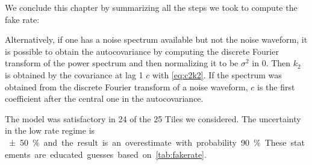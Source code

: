 We conclude this chapter by summarizing all the steps we took to compute the
fake rate:
%
%
Alternatively, if one has a noise spectrum available but not the noise
waveform, it is possible to obtain the autocovariance by computing the discrete
Fourier transform of the power spectrum \cite[84]{ferrante2015} and then
normalizing it to be $\sigma^2$ in 0. Then $k_2$ is obtained by the covariance
at lag 1 $c$ with \eqref{eq:c2k2}. If the spectrum was obtained from the
discrete Fourier transform of a noise waveform, $c$ is the first coefficient
after the central one in the autocovariance.

The model was satisfactory in 24 of the 25 Tiles we considered. The uncertainty
in the low rate regime is \SI{\pm50}\% and the result is an overestimate with
probability \SI{90}\%. These statements are educated guesses based on
\autoref{tab:fakerate}.

